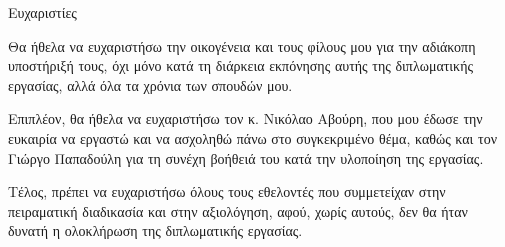 \begin{center}
{\LARGE Ευχαριστίες}\\[1cm]
\end{center}

\setlength\parindent{24pt}Θα ήθελα να ευχαριστήσω την οικογένεια και τους φίλους μου για την αδιάκοπη υποστήριξή τους, όχι μόνο κατά τη διάρκεια εκπόνησης αυτής της διπλωματικής εργασίας, αλλά όλα τα χρόνια των σπουδών μου.

Επιπλέον, θα ήθελα να ευχαριστήσω τον κ. Νικόλαο Αβούρη, που μου έδωσε την ευκαιρία να εργαστώ και να ασχοληθώ πάνω στο συγκεκριμένο θέμα, καθώς και τον Γιώργο Παπαδούλη  για τη συνέχη βοήθειά του κατά την υλοποίηση της εργασίας.

Τέλος, πρέπει να ευχαριστήσω όλους τους εθελοντές που συμμετείχαν στην πειραματική διαδικασία και στην αξιολόγηση, αφού, χωρίς αυτούς, δεν θα ήταν δυνατή η ολοκλήρωση της διπλωματικής εργασίας.